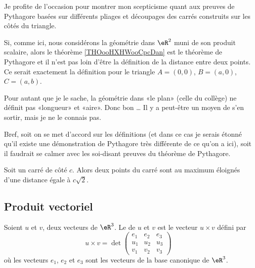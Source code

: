 \begin{normaltext}
	Je profite de l'occasion pour montrer mon scepticisme quant aux preuves de Pythagore basées sur différents pliages et découpages des carrés construits sur les côtés du triangle.

	Si, comme ici, nous considérons la géométrie dans \( \eR^2\) muni de son produit scalaire, alors le théorème \ref{THOooHXHWooCpcDan} est le théorème de Pythagore et il n'est pas loin d'être la définition de la distance entre deux points. Ce serait exactement la définition pour le triangle \( A=(0,0)\), \( B=(a,0)\), \( C=(a,b)\).

	Pour autant que je le sache, la géométrie dans «le plan» (celle du collège) ne définit pas «longueur» et «aire». Donc bon \ldots{}  Il y a peut-être un moyen de s'en sortir, mais je ne le connais pas.

	Bref, soit on se met d'accord sur les définitions (et dans ce cas je serais étonné qu'il existe une démonstration de Pythagore très différente de ce qu'on a ici), soit il faudrait se calmer avec les soi-disant preuves du théorème de Pythagore.
\end{normaltext}

\begin{lemma}       \label{LEMooKDGRooMmJqnn}
	Soit un carré de côté \( c\). Alors deux points du carré sont au maximum éloignés d'une distance égale à \( c\sqrt{ 2 }\).
\end{lemma}


\subsection{Produit vectoriel}

\begin{definition}      \label{DEFooTNTNooRjhuJZ}
	Soient \( u\) et \( v\), deux vecteurs de \( \eR^3\). Le  de \( u\) et \( v\) est le vecteur \( u\times v\) défini par
	\begin{equation}    \label{EQooCUJRooFuFPaZ}
		u\times v=\det\begin{pmatrix}
			e_1 & e_2 & e_3 \\
			u_1 & u_2 & u_3 \\
			v_1 & v_2 & v_3
		\end{pmatrix}
	\end{equation}
	où les vecteurs \( e_1\), \( e_2\) et \( e_3\) sont les vecteurs de la base canonique de \( \eR^3\).
\end{definition}

